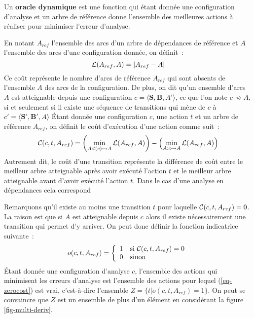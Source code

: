 \documentclass[11pt,openany]{book}
\begin{document}
Un {\bf oracle dynamique} est une fonction qui étant donnée une
configuration d'analyse et un arbre de référence donne l'ensemble des meilleures
actions à réaliser pour minimiser l'erreur d'analyse.

En notant $A_{ref}$ l'ensemble des arcs d'un arbre de dépendances de
référence et $A$ l'ensemble des arcs d'une configuration donnée, on
définit~:
\begin{equation}
{\cal L} (A_{ref},A) = |A_{ref} - A|
\end{equation}
Ce coût représente le nombre d'arcs de référence $A_{ref}$ qui sont
absents de l'ensemble  $A$ des arcs de la configuration. 
De plus, on dit qu'un ensemble d'arcs $A$ est atteignable depuis une
configuration $c = \langle \mathbf{S},\mathbf{B},A'\rangle$, ce que
l'on note $c\rightsquigarrow A$, si et seulement si il existe
une séquence de transitions qui mène de $c$ à $c' = \langle \mathbf{S}',\mathbf{B}',A\rangle$
\'Etant donnée une configuration $c$, une action $t$ et un arbre de
référence $A_{ref}$, on définit le coût d'exécution d'une action comme 
suit~:
\begin{equation}
\label{eq-odyn-objective}
{\cal C}(c,t,A_{ref}) = \left(\mathop{\text{min}}_{A:t(c)\rightsquigarrow A} {\cal
  L}(A_{ref},A) \right)- \left(\mathop{\text{min}}_{A:c\rightsquigarrow A} {\cal
  L}(A_{ref},A)  \right) 
\end{equation}
Autrement dit, le coût d'une transition représente la différence de
coût entre le meilleur arbre atteignable après avoir exécuté l'action $t$
et le meilleur arbre atteignable avant d'avoir exécuté l'action
$t$. Dans le cas d'une analyse en dépendances cela correspond 

Remarquons qu'il existe au moins une transition $t$ pour laquelle 
${\cal C}(c,t,A_{ref}) = 0$. La raison est que si $A$ est atteignable
depuis $c$ alors il existe nécessairement une transition qui permet
d'y arriver. On peut donc définir la fonction indicatrice suivante~:
\begin{equation}
\label{eq-zerocost}
o(c,t,A_{ref}) = \left\{
\begin{array}{ll}
1 & \text{si } {\cal C}(c,t,A_{ref}) = 0\\
0 & \text{sinon} 
\end{array}\right.
\end{equation}
\'Etant donnée une configuration d'analyse $c$, 
l'ensemble des actions qui minimisent les erreurs d'analyse est
l'ensemble des actions pour lequel (\ref{eq-zerocost}) est vrai, c'est-à-dire 
 l'ensemble $Z = \{ t |  o(c,t,A_{ref})  = 1\}$. On peut se convaincre
 que $Z$ est un ensemble de plus d'un élément en considérant la figure \ref{fig-multi-deriv}.
\end{document}
